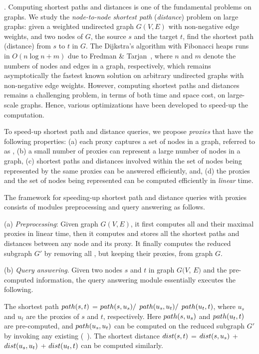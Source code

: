 . Computing shortest paths and distances is one of the fundamental problems on graphs. We study the {\em node-to-node shortest path} ({\em distance}) problem on large graphs: given a weighted undirected graph $G(V, E)$ with non-negative edge weights, and two nodes of $G$, the source $s$ and the target $t$, find the shortest path (distance) from $s$ to $t$ in $G$. The Dijkstra's algorithm with Fibonacci heaps runs in $O(n\log n + m)$ due to Fredman \& Tarjan~\cite{CormenLRS01}, where $n$ and $m$ denote the numbers of nodes and edges in a graph, respectively, which remains asymptotically the fastest known solution on arbitrary undirected graphs with non-negative edge weights.
However, computing shortest  paths and distances remains a challenging problem, in terms of both time and space cost, on large-scale graphs. Hence, various optimizations have been developed to speed-up the computation.

To speed-up shortest  path and distance queries, we propose {\em proxies} that have the following properties:
%
(a) each proxy captures a set of nodes in a graph, referred to as \dra, 
%
(b) a small number of proxies can represent a large number of nodes in a graph,
%
(c) shortest paths and distances involved within the set of nodes being represented by the same proxies can be answered efficiently, and,
%
(d) the proxies and the set of nodes being represented can be computed efficiently in {\em linear} time.



The framework for speeding-up shortest path and distance queries with proxies consists of modules preprocessing and query answering as follows.


\ni(a) {\em Preprocessing}: Given graph $G(V, E)$, it first computes all \dras and their maximal proxies in linear time, then it computes and stores all the shortest paths and distances between any node and its proxy. It finally computes the reduced subgraph $G'$ by removing all \dras, but keeping their proxies, from graph $G$.


\ni(b) {\em Query answering}. Given two nodes $s$ and $t$ in graph $G(V$, $E)$  and the pre-computed information, the query answering module essentially executes the following.

The shortest path $\path(s, t)$ = $\path(s, u_s)/$ $\path(u_s, u_t)/$ $\path(u_t, t)$, where $u_s$ and $u_t$ are the proxies of $s$ and $t$, respectively.
Here  $\path(s, u_s)$ and $\path(u_t, t)$ are pre-computed, and $\path(u_s, u_t)$ can be computed on the reduced subgraph $G'$ by invoking any existing 
(\eg \ah~\cite{zhu2013shortest}). 
%
The shortest distance $\dist(s, t)$ = $\dist(s, u_s)$ + $\dist(u_s, u_t)$ + $\dist(u_t, t)$ can be computed similarly.

